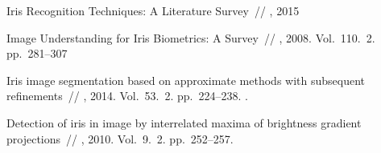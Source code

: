 \documentclass[12pt, twoside]{article}
\begin{document}
\begin{thebibliography}{99}


   Iris Recognition Techniques: A Literature Survey~//
    , 2015

   Image Understanding for Iris Biometrics: A Survey~//
    , 2008. Vol.~110. \No\,2. pp.~281--307
	
   Iris image segmentation based on approximate methods
with subsequent refinements~//
    , 2014. Vol.~53. \No\,2. pp.~224--238.
	.
	
   Detection of iris in image by interrelated maxima of brightness gradient projections~//
    , 2010. Vol.~9. \No\,2. pp.~252--257.
	
 
 	
\end{thebibliography}

\end{document}
